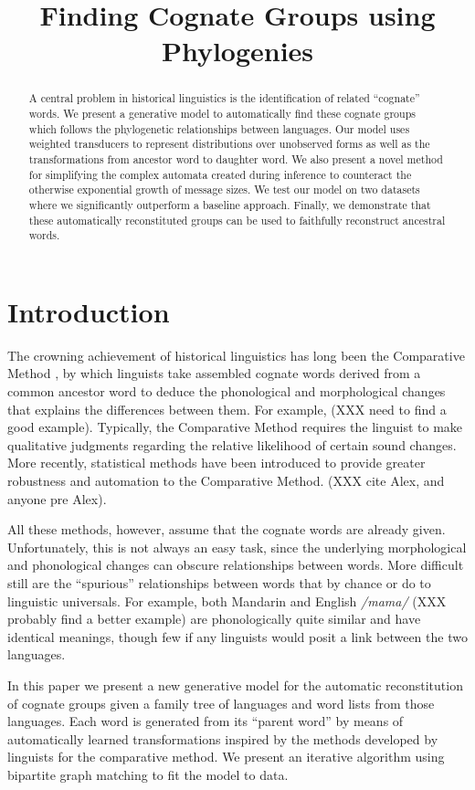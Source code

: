 \documentclass[11pt,a4paper]{article}
\title{Finding Cognate Groups using Phylogenies}
\author{}
\date{}
\begin{document}
\maketitle
\begin{abstract}
  A central problem in historical linguistics is the identification
  of related ``cognate'' words. We present a generative model to
  automatically find these cognate groups which follows the
  phylogenetic relationships between languages. Our model uses
  weighted transducers to represent distributions over unobserved
  forms as well as the transformations from ancestor word to daughter
  word. We also present a novel method for simplifying the complex
  automata created during inference to counteract the otherwise
  exponential growth of message sizes. We test our model on two
  datasets where we significantly outperform a baseline approach.
  Finally, we demonstrate that these automatically reconstituted
  groups can be used to faithfully reconstruct ancestral words.
\end{abstract}
\section{Introduction}

The crowning achievement of historical linguistics has long been
the Comparative Method \cite{ohala93phonetics}, by which
linguists take assembled cognate words derived from a common ancestor
word to deduce the phonological and morphological changes that
explains the differences between them. For example, (XXX need to
find a good example). Typically, the Comparative Method requires
the linguist to make qualitative judgments regarding the relative
likelihood of certain sound changes.  More recently, statistical
methods have been introduced to provide greater robustness and
automation to the Comparative Method. (XXX cite Alex, and anyone
pre Alex).

All these methods, however, assume that the cognate words are already
given. Unfortunately, this is not always an easy task, since the
underlying morphological and phonological changes can obscure
relationships between words.  More difficult still are the ``spurious''
relationships between words that by chance or do to linguistic
universals. For example, both Mandarin and English \textit{/mama/}
(XXX probably find a better example) are phonologically quite similar
and have identical meanings, though few if any linguists would posit
a link between the two languages.

In this paper we present a new generative model for the automatic
reconstitution of cognate groups given a family tree of languages
and word lists from those languages. Each word is generated from
its ``parent word'' by means of automatically learned transformations
inspired by the methods developed by linguists for the comparative
method. We present an iterative algorithm using bipartite graph matching
to fit the model to data.
\end{document}
